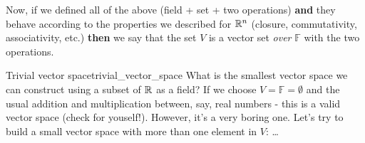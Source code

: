 Now, if we defined all of the above (field + set + two operations) \textbf{and} they behave according to the properties we described for $\Rs[n]$ (closure, commutativity, associativity, etc.) \textbf{then} we say that the set $V$ is a vector set \textit{over} $\mathbb{F}$ with the two operations.

\begin{example}{Trivial vector space}{trivial_vector_space}
    What is the smallest vector space we can construct using a subset of $\Rs$ as a field? If we choose $V=\mathbb{F}=\emptyset$ and the usual addition and multiplication between, say, real numbers - this is a valid vector space (check for youself!). However, it's a very boring one. Let's try to build a small vector space with more than one element in $V$: \ldots

    \lipsum[1-6]
\end{example}
